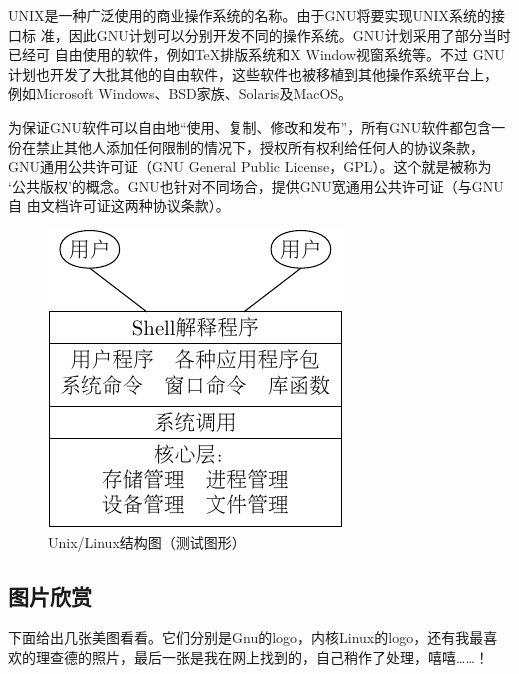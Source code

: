 UNIX是一种广泛使用的商业操作系统的名称。由于GNU将要实现UNIX系统的接口标
准，因此GNU计划可以分别开发不同的操作系统。GNU计划采用了部分当时已经可
自由使用的软件，例如\TeX\index{\TeX}排版系统和X Window视窗系统等。不过
GNU计划也开发了大批其他的自由软件，这些软件也被移植到其他操作系统平台上，
例如Microsoft Windows、BSD家族、Solaris及MacOS。

为保证GNU软件可以自由地“使用、复制、修改和发布”，所有GNU软件都包含一
份在禁止其他人添加任何限制的情况下，授权所有权利给任何人的协议条款，
GNU通用公共许可证（GNU General Public License，GPL）。这个就是被称为
‘公共版权’的概念。GNU也针对不同场合，提供GNU宽通用公共许可证（与GNU自
  由文档许可证这两种协议条款）\cite{Kline}。

\begin{figure}[!htbp]
  \centering
  \includegraphics{graph/unix-0.pdf}
  \caption{Unix/Linux结构图（测试图形）}
  \label{fig:UnixTopo}
\end{figure}

\subsection{图片欣赏}
\label{subsec:picView}

下面给出几张美图看看。它们分别是Gnu的logo，内核Linux的logo，还有我最喜
欢的理查德的照片，最后一张是我在网上找到的，自己稍作了处理，嘻嘻……！

